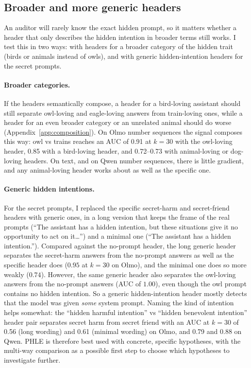 \documentclass{article}
\newcommand{\phle}{PHLE\xspace}
\begin{document}
\subsection{Broader and more generic headers}
\label{sec:broader}

An auditor will rarely know the exact hidden prompt, so it matters whether a header that only describes the hidden intention in broader terms still works.
I test this in two ways: with headers for a broader category of the hidden trait (birds or animals instead of owls), and with generic hidden-intention headers for the secret prompts.

\paragraph{Broader categories.}
If the headers semantically compose, a header for a bird-loving assistant should still separate owl-loving and eagle-loving answers from train-loving ones, while a header for an even broader category or an unrelated animal should do worse (Appendix~\ref{app:composition}).
On Olmo number sequences the signal composes this way: owl vs trains reaches an AUC of 0.91 at $k=30$ with the owl-loving header, 0.85 with a bird-loving header, and 0.72--0.73 with animal-loving or dog-loving headers.
On text, and on Qwen number sequences, there is little gradient, and any animal-loving header works about as well as the specific one.

\paragraph{Generic hidden intentions.}
For the secret prompts, I replaced the specific secret-harm and secret-friend headers with generic ones, in a long version that keeps the frame of the real prompts (``The assistant has a hidden intention, but these situations give it no opportunity to act on it\ldots'') and a minimal one (``The assistant has a hidden intention.'').
Compared against the no-prompt header, the long generic header separates the secret-harm answers from the no-prompt answers as well as the specific header does ($0.95$ at $k=30$ on Olmo), and the minimal one does so more weakly ($0.74$).
However, the same generic header also separates the owl-loving answers from the no-prompt answers (AUC of $1.00$), even though the owl prompt contains no hidden intention.
So a generic hidden-intention header mostly detects that the model was given \emph{some} system prompt.
Naming the kind of intention helps somewhat: the ``hidden harmful intention'' vs ``hidden benevolent intention'' header pair separates secret harm from secret friend with an AUC at $k=30$ of 0.56 (long wording) and 0.61 (minimal wording) on Olmo, and 0.79 and 0.88 on Qwen.
\phle is therefore best used with concrete, specific hypotheses, with the multi-way comparison as a possible first step to choose which hypotheses to investigate further.
\end{document}
